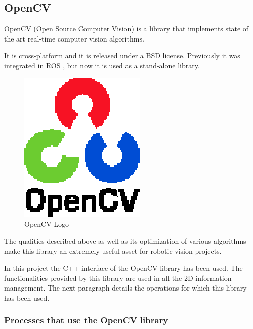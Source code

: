 \newpage

\subsection{OpenCV}
\label{opencv}

OpenCV\cite{opencv} (Open Source Computer Vision) is a library that implements state of the art real-time computer vision 
algorithms. 

It is cross-platform and it is released under a BSD\cite{BSD} license. Previously it was integrated in ROS \cite{ros}, but
now it is used as a stand-alone library.  

\begin{figure}[h]
	\begin{center}
    \includegraphics[scale=1]{img/opencv/logo.eps}
	\caption[OpenCV Logo]{OpenCV Logo}
	\end{center}
\end{figure}

The qualities described above as well as its optimization of various algorithms make this library an extremely useful 
asset for robotic vision projects. 


In this project the C++ interface of the OpenCV library has been used. The functionalities provided by this library are used in all the 2D information management. The next paragraph details the operations for which this library has been used. 

\subsubsection{Processes that use the OpenCV library}

